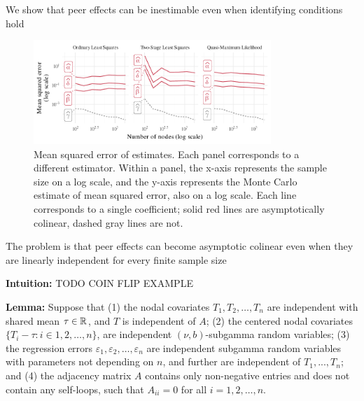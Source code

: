 \documentclass[final]{beamer}
\newlength{\colwidth}
\begin{document}
\begin{frame}[t]
\begin{columns}[t]
        \begin{column}{\colwidth}
            \begin{block}{We show that peer effects can be inestimable even when identifying conditions hold}
                \begin{figure}
                    \centering
                    \includegraphics[width=0.8\textwidth]{./figures/simulations/biometrika-mse.pdf}
                    \caption{Mean squared error of estimates. Each panel corresponds to a different estimator. Within a panel, the x-axis represents the sample size on a log scale, and the y-axis represents the Monte Carlo estimate of mean squared error, also on a log scale. Each line corresponds to a single coefficient; solid red lines are asymptotically colinear, dashed gray lines are not.}
                    \label{fig:mse-problem}
                \end{figure}
            \end{block}

            \begin{block}{The problem is that peer effects can become asymptotic colinear even when they are linearly independent for every finite sample size}

                \textbf{Intuition:} TODO COIN FLIP EXAMPLE

                \textbf{Lemma:} Suppose that (1) the nodal covariates $T_1,T_2,\dots,T_n$ are independent with shared mean $\tau \in \mathbb{R}$, and $T$ is independent of $A$; (2) the centered nodal covariates $\{ T_i - \tau : i \in 1,2,\dots, n \}$, are independent $(\nu,b)$-subgamma random variables; (3) the regression errors $\varepsilon_1, \varepsilon_2, \dots, \varepsilon_n$ are independent subgamma random variables with parameters not depending on $n$, and further are independent of $T_1, ..., T_n$; and (4) the adjacency matrix $A$ contains only non-negative entries and does not contain any self-loops, such that $A_{ii} = 0$ for all $i = 1,2,\dots, n$.


\end{block}
\end{column}
\end{columns}
\end{frame}
\end{document}
